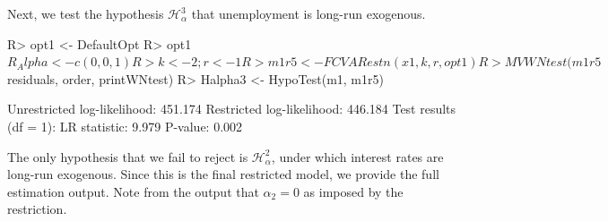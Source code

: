\documentclass[article]{jss}
\begin{document}
Next, we test the hypothesis $\mathscr{H}_{\alpha}^3$ that unemployment is long-run exogenous.

\begin{CodeChunk} 
\begin{CodeInput}
R> opt1 <- DefaultOpt
R> opt1$R_Alpha <- c(0, 0, 1)
R> k <- 2; r <- 1
R> m1r5 <- FCVARestn(x1, k, r, opt1)
R> MVWNtest(m1r5$residuals, order, printWNtest)
R> Halpha3 <- HypoTest(m1, m1r5)
\end{CodeInput}
\begin{CodeOutput}
Unrestricted log-likelihood: 451.174
Restricted log-likelihood:   446.184
Test results (df = 1):
LR statistic: 	 9.979
P-value: 	 0.002
\end{CodeOutput}
\end{CodeChunk}  

The only hypothesis that we fail to reject is $\mathscr{H}_{\alpha}^2$, under which interest rates are long-run exogenous. Since this is the final restricted model, we provide the full estimation output. Note from the output that $\alpha_2 = 0$ as imposed by the restriction.
\end{document}
